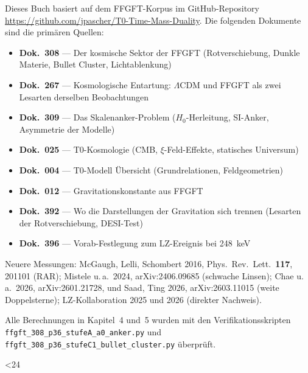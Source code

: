 \documentclass[11pt,oneside]{book}
\begin{document}
Dieses Buch basiert auf dem FFGFT-Korpus im GitHub-Repository
\url{https://github.com/jpascher/T0-Time-Mass-Duality}.
Die folgenden Dokumente sind die primären Quellen:

\begin{itemize}
  \item \textbf{Dok.~308} — Der kosmische Sektor der FFGFT
    (Rotverschiebung, Dunkle Materie, Bullet Cluster, Lichtablenkung)
  \item \textbf{Dok.~267} — Kosmologische Entartung:
    $\Lambda$CDM und FFGFT als zwei Lesarten derselben Beobachtungen
  \item \textbf{Dok.~309} — Das Skalenanker-Problem
    ($H_0$-Herleitung, SI-Anker, Asymmetrie der Modelle)
  \item \textbf{Dok.~025} — T0-Kosmologie
    (CMB, $\xi$-Feld-Effekte, statisches Universum)
  \item \textbf{Dok.~004} — T0-Modell Übersicht
    (Grundrelationen, Feldgeometrien)
  \item \textbf{Dok.~012} — Gravitationskonstante aus FFGFT
  \item \textbf{Dok.~392} — Wo die Darstellungen der Gravitation
    sich trennen (Lesarten der Rotverschiebung, DESI-Test)
  \item \textbf{Dok.~396} — Vorab-Festlegung zum LZ-Ereignis bei 248~keV
\end{itemize}

Neuere Messungen: McGaugh, Lelli, Schombert 2016, Phys.\ Rev.\ Lett.\
\textbf{117}, 201101 (RAR); Mistele u.\,a.\ 2024, arXiv:2406.09685
(schwache Linsen); Chae u.\,a.\ 2026, arXiv:2601.21728, und Saad, Ting
2026, arXiv:2603.11015 (weite Doppelsterne); LZ-Kollaboration 2025
und 2026 (direkter Nachweis).

Alle Berechnungen in Kapitel~4 und~5 wurden mit den
Verifikationsskripten
\texttt{ffgft\_308\_p36\_stufeA\_a0\_anker.py} und
\texttt{ffgft\_308\_p36\_stufeC1\_bullet\_cluster.py}
überprüft.

\clearpage
\makeatletter
\loop\ifnum\ReadonlyShipoutCounter<24
  \null\thispagestyle{empty}\clearpage
\repeat
\makeatother
\end{document}
